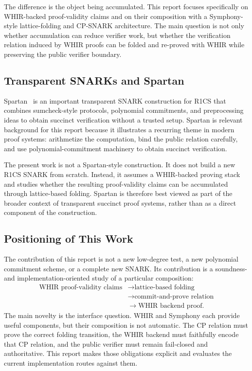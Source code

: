 \documentclass[11pt]{article}
\theoremstyle{definition}
\begin{document}
The difference is the object being accumulated. This report focuses specifically
on WHIR-backed proof-validity claims and on their composition with a
Symphony-style lattice-folding and CP-SNARK architecture. The main question is
not only whether accumulation can reduce verifier work, but whether the
verification relation induced by WHIR proofs can be folded and re-proved with
WHIR while preserving the public verifier boundary.

\subsection{Transparent SNARKs and Spartan}

Spartan~\cite{Spartan} is an important transparent SNARK construction for R1CS
that combines sumcheck-style protocols, polynomial commitments, and
preprocessing ideas to obtain succinct verification without a trusted setup.
Spartan is relevant background for this report because it illustrates a
recurring theme in modern proof systems: arithmetize the computation, bind the
public relation carefully, and use polynomial-commitment machinery to obtain
succinct verification.

The present work is not a Spartan-style construction. It does not build a new
R1CS SNARK from scratch. Instead, it assumes a WHIR-backed proving stack and
studies whether the resulting proof-validity claims can be accumulated through
lattice-based folding. Spartan is therefore best viewed as part of the broader
context of transparent succinct proof systems, rather than as a direct component
of the construction.

\subsection{Positioning of This Work}

The contribution of this report is not a new low-degree test, a new polynomial
commitment scheme, or a complete new SNARK. Its contribution is a soundness- and
implementation-oriented study of a particular composition:
\[
  \begin{aligned}
  \text{WHIR proof-validity claims}
  &\longrightarrow \text{lattice-based folding}\\
  &\longrightarrow \text{commit-and-prove relation}\\
  &\longrightarrow \text{WHIR backend proof}.
  \end{aligned}
\]
The main novelty is the interface question. WHIR and Symphony each provide
useful components, but their composition is not automatic. The CP relation must
prove the correct folding transition, the WHIR backend must faithfully encode
that CP relation, and the public verifier must remain fail-closed and
authoritative. This report makes those obligations explicit and evaluates the
current implementation routes against them.
\end{document}
